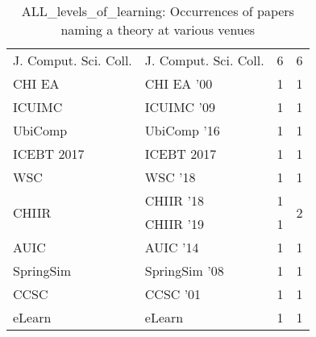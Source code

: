\begin{table*}[t]
\begin{tabular}{llrr}
\multirow{1}{*}{J. Comput. Sci. Coll.} & J. Comput. Sci. Coll. & 6 & \multirow{1}{*}{6}\\
\multirow{1}{*}{CHI EA } & CHI EA '00 & 1 & \multirow{1}{*}{1}\\
\multirow{1}{*}{ICUIMC } & ICUIMC '09 & 1 & \multirow{1}{*}{1}\\
\multirow{1}{*}{UbiComp } & UbiComp '16 & 1 & \multirow{1}{*}{1}\\
\multirow{1}{*}{ICEBT 2017} & ICEBT 2017 & 1 & \multirow{1}{*}{1}\\
\multirow{1}{*}{WSC } & WSC '18 & 1 & \multirow{1}{*}{1}\\
\multirow{2}{*}{CHIIR } & CHIIR '18 & 1 & \multirow{2}{*}{2}\\
& CHIIR '19 & 1 &\\
\multirow{1}{*}{AUIC } & AUIC '14 & 1 & \multirow{1}{*}{1}\\
\multirow{1}{*}{SpringSim } & SpringSim '08 & 1 & \multirow{1}{*}{1}\\
\multirow{1}{*}{CCSC } & CCSC '01 & 1 & \multirow{1}{*}{1}\\
\multirow{1}{*}{eLearn} & eLearn & 1 & \multirow{1}{*}{1}\\
\end{tabular}
\caption{ALL\_levels\_of\_learning: Occurrences of papers naming a theory at various venues}
\end{table*}